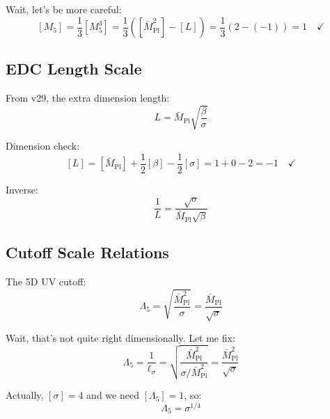 \documentclass[11pt,a4paper]{article}
\theoremstyle{definition}
\begin{document}
Wait, let's be more careful:
\begin{equation}
\label{eq:m5-dim-check-v2}
[M_5] = \frac{1}{3}[M_5^3] = \frac{1}{3}\left([\bar{M}_{\text{Pl}}^2] - [L]\right)
  = \frac{1}{3}(2 - (-1)) = 1 \quad \checkmark
\end{equation}

\subsection{EDC Length Scale}
\label{subsec:edc-length}

From v29, the extra dimension length:
\begin{equation}
\label{eq:L-def}
L = \bar{M}_{\text{Pl}} \sqrt{\frac{\beta}{\sigma}}
\end{equation}

Dimension check:
\begin{equation}
\label{eq:L-dim-check}
[L] = [\bar{M}_{\text{Pl}}] + \frac{1}{2}[\beta] - \frac{1}{2}[\sigma]
  = 1 + 0 - 2 = -1 \quad \checkmark
\end{equation}

Inverse:
\begin{equation}
\label{eq:L-inverse}
\frac{1}{L} = \frac{\sqrt{\sigma}}{\bar{M}_{\text{Pl}} \sqrt{\beta}}
\end{equation}

\subsection{Cutoff Scale Relations}
\label{subsec:cutoff-relations}

The 5D UV cutoff:
\begin{equation}
\label{eq:lambda5-def}
\Lambda_5 = \sqrt{\frac{\bar{M}_{\text{Pl}}^2}{\sigma}} = \frac{\bar{M}_{\text{Pl}}}{\sqrt{\sigma}}
\end{equation}

Wait, that's not quite right dimensionally. Let me fix:
\begin{equation}
\label{eq:lambda5-def-v2}
\Lambda_5 = \frac{1}{\ell_\sigma} = \sqrt{\frac{\bar{M}_{\text{Pl}}^2}{\sigma/\bar{M}_{\text{Pl}}^2}}
  = \frac{\bar{M}_{\text{Pl}}^2}{\sqrt{\sigma}}
\end{equation}

Actually, $[\sigma] = 4$ and we need $[\Lambda_5] = 1$, so:
\begin{equation}
\label{eq:lambda5-correct}
\Lambda_5 = \sigma^{1/4}
\end{equation}
\end{document}
